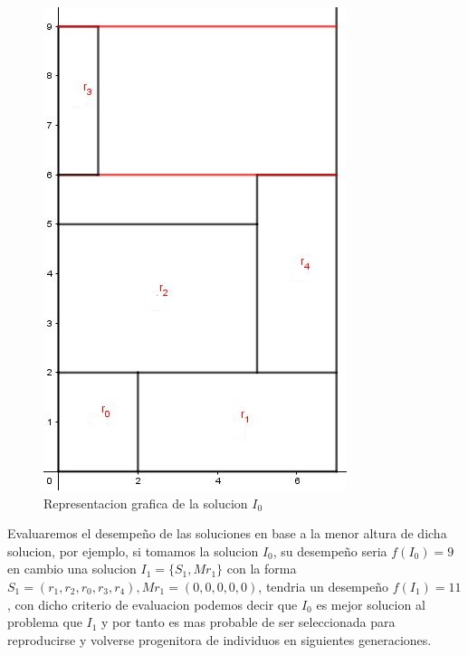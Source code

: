 \documentclass[10pt]{article}
\begin{document}
\begin{figure}[H]
\centerline{\includegraphics[width=0.7\linewidth]{grafica_ejemplo_solucion_GA.jpg}}
\caption{Representacion grafica de la solucion $I_0$}
\label{fig_1}
\end{figure}

Evaluaremos el desempeño de las soluciones en base a la menor altura de dicha solucion, por ejemplo, si tomamos la solucion $I_0$, su desempeño seria $f(I_0) = 9$ en cambio una solucion $I_1 = \{S_1,Mr_1\}$ con la forma $S_1 = (r_1,r_2,r_0,r_3,r_4), Mr_1 = (0,0,0,0,0)$, tendria un desempeño $f(I_1) = 11$, con dicho criterio de evaluacion podemos decir que $I_0$ es mejor solucion al problema que $I_1$ y por tanto es mas probable de ser seleccionada para reproducirse y volverse progenitora de individuos en siguientes generaciones.
\end{document}
